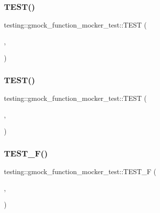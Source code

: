 \subsubsection{\texorpdfstring{TEST()}{TEST()}\hspace{0.1cm}{\footnotesize\ttfamily [13/14]}}
{\footnotesize\ttfamily testing\+::gmock\+\_\+function\+\_\+mocker\+\_\+test\+::\+T\+E\+ST (\begin{DoxyParamCaption}\item[{Mock\+Method\+Mock\+Function\+Test}]{,  }\item[{As\+Std\+Function\+With\+Reference\+Parameter}]{ }\end{DoxyParamCaption})}

\mbox{\label{namespacetesting_1_1gmock__function__mocker__test_a5c28161d4686a85b0e5bf4a1f2b961f6}} 
\subsubsection{\texorpdfstring{TEST()}{TEST()}\hspace{0.1cm}{\footnotesize\ttfamily [14/14]}}
{\footnotesize\ttfamily testing\+::gmock\+\_\+function\+\_\+mocker\+\_\+test\+::\+T\+E\+ST (\begin{DoxyParamCaption}\item[{Mock\+Method\+Mock\+Function\+Test}]{,  }\item[{Mock\+Method\+Size\+Overhead}]{ }\end{DoxyParamCaption})}

\mbox{\label{namespacetesting_1_1gmock__function__mocker__test_ae7f9fb0bb0ecf0b1ba4b82886b90ab2f}} 
\subsubsection{\texorpdfstring{TEST\_F()}{TEST\_F()}\hspace{0.1cm}{\footnotesize\ttfamily [1/13]}}
{\footnotesize\ttfamily testing\+::gmock\+\_\+function\+\_\+mocker\+\_\+test\+::\+T\+E\+S\+T\+\_\+F (\begin{DoxyParamCaption}\item[{\mbox{\hyperlink{classtesting_1_1gmock__function__mocker__test_1_1_mock_method_function_mocker_test}{Mock\+Method\+Function\+Mocker\+Test}}}]{,  }\item[{Mocks\+Void\+Function}]{ }\end{DoxyParamCaption})}

